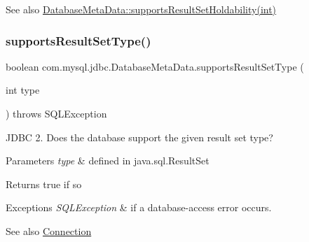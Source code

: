 \begin{DoxySeeAlso}{See also}
\mbox{\hyperlink{classcom_1_1mysql_1_1jdbc_1_1_database_meta_data_a75ad03ea2835ac88e0a16dd0fa81cf0d}{Database\+Meta\+Data\+::supports\+Result\+Set\+Holdability(int)}} 
\end{DoxySeeAlso}
\mbox{\label{classcom_1_1mysql_1_1jdbc_1_1_database_meta_data_ab0801f98fb063d2f7d734b19405b6fcf}} 
\subsubsection{\texorpdfstring{supports\+Result\+Set\+Type()}{supportsResultSetType()}}
{\footnotesize\ttfamily boolean com.\+mysql.\+jdbc.\+Database\+Meta\+Data.\+supports\+Result\+Set\+Type (\begin{DoxyParamCaption}\item[{int}]{type }\end{DoxyParamCaption}) throws S\+Q\+L\+Exception}

J\+D\+BC 2. Does the database support the given result set type?


\begin{DoxyParams}{Parameters}
{\em type} & defined in java.\+sql.\+Result\+Set \\
\hline
\end{DoxyParams}
\begin{DoxyReturn}{Returns}
true if so 
\end{DoxyReturn}

\begin{DoxyExceptions}{Exceptions}
{\em S\+Q\+L\+Exception} & if a database-\/access error occurs. \\
\hline
\end{DoxyExceptions}
\begin{DoxySeeAlso}{See also}
\mbox{\hyperlink{interfacecom_1_1mysql_1_1jdbc_1_1_connection}{Connection}} 
\end{DoxySeeAlso}
\mbox{\label{classcom_1_1mysql_1_1jdbc_1_1_database_meta_data_ad320246c571d9f4597ffae3acbb781f6}} 
